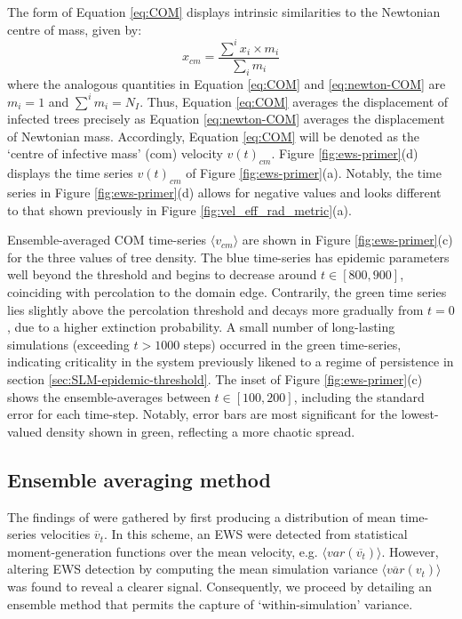 The form of Equation \ref{eq:COM} displays intrinsic similarities to the Newtonian centre of mass, given by:
\begin{equation}
 x_{cm} = \frac{\sum^i x_i\times m_i}{\sum_i m_i}
\label{eq:newton-COM}
\end{equation}
where the analogous quantities in Equation \ref{eq:COM} and \ref{eq:newton-COM} are $m_i=1$ and $\sum^im_i= N_I$.
Thus, Equation \ref{eq:COM} averages the displacement of infected trees precisely as Equation \ref{eq:newton-COM} averages the displacement of Newtonian mass. Accordingly, Equation \ref{eq:COM} will be denoted as the `centre of infective mass' (\acrshort{com}) velocity $v(t)_{cm}$. 
Figure \ref{fig:ews-primer}(d) displays the time series $v(t)_{cm}$ of Figure \ref{fig:ews-primer}(a). Notably, the time series in Figure \ref{fig:ews-primer}(d) allows for negative values and looks different to that shown previously in Figure \ref{fig:vel_eff_rad_metric}(a).

Ensemble-averaged COM time-series $\langle v_{cm}\rangle$ are shown in Figure \ref{fig:ews-primer}(c) for the three values of tree density.
The blue time-series has epidemic parameters well beyond the threshold and begins to decrease around $t \in [800, 900]$, coinciding with percolation to the domain edge.
Contrarily, the green time series lies slightly above the percolation threshold and decays more gradually from $t=0$, due to a higher extinction probability. 
A small number of long-lasting simulations (exceeding $t>1000$ steps) occurred in the green time-series, indicating criticality in the system\textemdash 
previously likened to a regime of persistence in section \ref{sec:SLM-epidemic-threshold}.
The inset of Figure \ref{fig:ews-primer}(c) shows the ensemble-averages between $t\in [100, 200]$, including the standard error for each time-step.
Notably, error bars are most significant for the lowest-valued density shown in green, reflecting a more chaotic spread.

\subsection{Ensemble averaging method}
\label{sec:ens-avg-method}

The findings of \cite{OROZCOFUENTES201912} were gathered by first producing a distribution of mean time-series velocities $\overline{v}_t$.
In this scheme, an EWS were detected from statistical moment-generation functions over the mean velocity, e.g. $\big\langle var(\overline{v_t}) \big\rangle $.
However, altering EWS detection by computing the mean simulation variance $ \big\langle \overline{var}({v}_t) \big\rangle $ was found to reveal a clearer signal.
Consequently, we proceed by detailing an ensemble method that permits the capture of `within-simulation' variance. 

